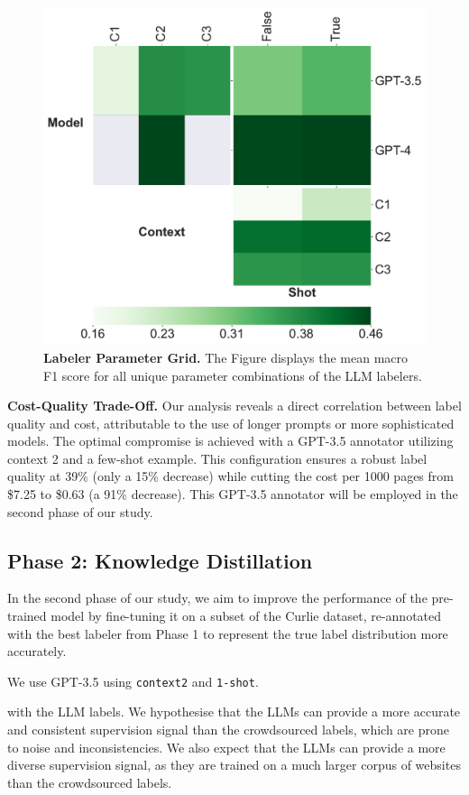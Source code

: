 \begin{figure}[!h]
    \centering
    \includegraphics[width=.8\columnwidth]{./figures/labelers-grid.pdf}
    \caption{\textbf{Labeler Parameter Grid.} The Figure displays the mean macro F1 score for all unique parameter combinations of the LLM labelers.}
    \label{fig:labelers-grid}
\end{figure}

\textbf{Cost-Quality Trade-Off.} Our analysis reveals a direct correlation between label quality and cost, attributable to the use of longer prompts or more sophisticated models. The optimal compromise is achieved with a GPT-3.5 annotator utilizing context 2 and a few-shot example. This configuration ensures a robust label quality at 39\% (only a 15\% decrease) while cutting the cost per 1000 pages from \$7.25 to \$0.63 (a 91\% decrease). This GPT-3.5 annotator will be employed in the second phase of our study.

\subsection{Phase 2: Knowledge Distillation}

In the second phase of our study, we aim to improve the performance of the pre-trained model by fine-tuning it on a subset of the Curlie dataset, re-annotated with the best labeler from Phase 1 to represent the true label distribution more accurately. 

We use GPT-3.5 using \texttt{context2} and \texttt{1-shot}.

with the LLM labels. We hypothesise that the LLMs can provide a more accurate and consistent supervision signal than the crowdsourced labels, which are prone to noise and inconsistencies. We also expect that the LLMs can provide a more diverse supervision signal, as they are trained on a much larger corpus of websites than the crowdsourced labels.

